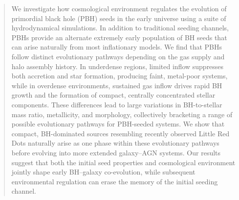 \documentclass[twocolumn,trackchanges]{aastex701}
\begin{document}

\begin{abstract}
We investigate how cosmological environment regulates the evolution of primordial black hole (PBH) seeds in the early universe using a suite of hydrodynamical simulations. 
In addition to traditional seeding channels, PBHs provide an alternate extremely early population of BH seeds that can arise naturally from most inflationary models.
We find that PBHs follow distinct evolutionary pathways depending on the gas supply and halo assembly history. 
In underdense regions, limited inflow suppresses both accretion and star formation, producing faint, metal-poor systems, while in overdense environments, sustained gas inflow drives rapid BH growth and the formation of compact, centrally concentrated stellar components. 
These differences lead to large variations in BH-to-stellar mass ratio, metallicity, and morphology, collectively bracketing a range of possible evolutionary pathways for PBH-seeded systems.
We show that compact, BH-dominated sources resembling recently observed Little Red Dots naturally arise as one phase within these evolutionary pathways before evolving into more extended galaxy--AGN systems.
Our results suggest that both the initial seed properties and cosmological environment jointly shape early BH--galaxy co-evolution, while subsequent environmental regulation can erase the memory of the initial seeding channel.
\end{abstract}

\end{document}
